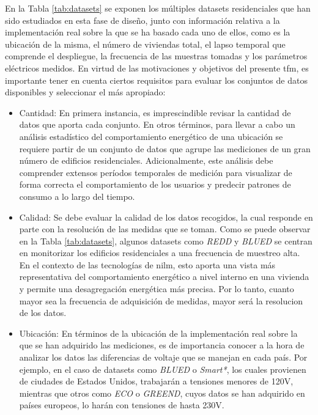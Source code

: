 \vspace{3mm}

En la Tabla \ref{tab:datasets} se exponen los múltiples datasets residenciales que han sido estudiados en esta fase de diseño, junto con información relativa a la implementación real sobre la que se ha basado cada uno de ellos, como es la ubicación de la misma, el número de viviendas total, el lapso temporal que comprende el despliegue, la frecuencia de las muestras tomadas y los parámetros eléctricos medidos. En virtud de las motivaciones y objetivos del presente \gls{tfm}, es importante tener en cuenta ciertos requisitos para evaluar los conjuntos de datos disponibles y seleccionar el más apropiado:

\vspace{1mm}

\begin{itemize}
    \item Cantidad: En primera instancia, es imprescindible revisar la cantidad de datos que aporta cada conjunto. En otros términos, para llevar a cabo un análisis estadístico del comportamiento energético de una ubicación se requiere partir de un conjunto de datos que agrupe las mediciones de un gran número de edificios residenciales. Adicionalmente, este análisis debe comprender extensos períodos temporales de medición para visualizar de forma correcta el comportamiento de los usuarios y predecir patrones de consumo a lo largo del tiempo.
    \item Calidad: Se debe evaluar la calidad de los datos recogidos, la cual responde en parte con la resolución de las medidas que se toman. Como se puede observar en la Tabla \ref{tab:datasets}, algunos datasets como \textit{REDD} y \textit{BLUED} se centran en monitorizar los edificios residenciales a una frecuencia de muestreo alta. En el contexto de las tecnologías de \gls{nilm}, esto aporta una vista más representativa del comportamiento energético a nivel interno en una vivienda y permite una desagregación energética más precisa. Por lo tanto, cuanto mayor sea la frecuencia de adquisición de medidas, mayor será la resolucion de los datos. 
    \item Ubicación: En términos de la ubicación de la implementación real sobre la que se han adquirido las mediciones, es de importancia conocer a la hora de analizar los datos las diferencias de voltaje que se manejan en cada país. Por ejemplo, en el caso de datasets como \textit{BLUED} o \textit{Smart*}, los cuales provienen de ciudades de Estados Unidos, trabajarán a tensiones menores de 120V, mientras que otros como \textit{ECO} o \textit{GREEND}, cuyos datos se han adquirido en países europeos, lo harán con tensiones de hasta 230V. \cite{greend} \cite{powercons}

\end{itemize}
